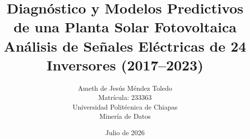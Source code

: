\title{
    \vspace*{4cm}
    \textbf{Diagnóstico y Modelos Predictivos de una Planta Solar Fotovoltaica} \\
    \large{Análisis de Señales Eléctricas de 24 Inversores (2017--2023)} \\
    \vspace{2cm}
}

\author{
    Ameth de Jes\'us M\'endez Toledo \\
    Matrícula: 233363 \\
    Universidad Politécnica de Chiapas \\
    Minería de Datos
}

\date{Julio de 2026}

\maketitle
\thispagestyle{empty}
\newpage
